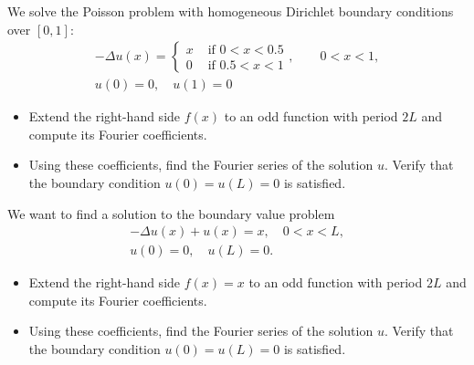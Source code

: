 \documentclass[11pt]{article}
\begin{document}
\begin{exercise}
    We solve the Poisson problem with homogeneous Dirichlet boundary conditions over $[0,1]$:
    \begin{gather*}
        - \Delta u(x) = \left\{\begin{array}{ll} x & \text{ if } 0 < x < 0.5 \\ 0 & \text{ if } 0.5 < x < 1 \end{array}\right., \qquad 0 < x < 1,
        \\
        u(0) = 0, \quad u(1) = 0
    \end{gather*}
    \begin{itemize}
        \item Extend the right-hand side $f(x)$ to an odd function with period $2L$ and compute its Fourier coefficients.
        \item Using these coefficients, find the Fourier series of the solution $u$. Verify that the boundary condition $u(0) = u(L) = 0$ is satisfied.
    \end{itemize}
\end{exercise}
\begin{solution}     
\end{solution}

\begin{exercise}
    We want to find a solution to the boundary value problem 
    \begin{gather*}
        - \Delta u(x) + u(x) = x, \quad 0 < x < L,
        \\
        u(0) = 0, \quad u(L) = 0.
    \end{gather*}
    \begin{itemize}
        \item Extend the right-hand side $f(x) = x$ to an odd function with period $2L$ and compute its Fourier coefficients.
        \item Using these coefficients, find the Fourier series of the solution $u$. Verify that the boundary condition $u(0) = u(L) = 0$ is satisfied.
    \end{itemize}
\end{exercise}
\begin{solution}     
\end{solution}
\end{document}
